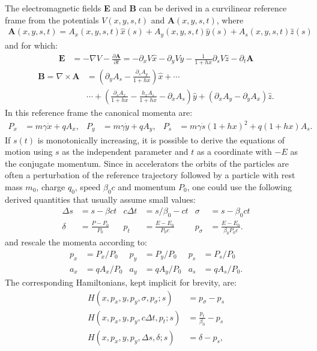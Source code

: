 \documentclass[english]{article}
\begin{document}
The electromagnetic fields {\bf E} and {\bf B} can be derived in a curvilinear
reference frame from the potentials $V(x,y,s,t)$ and $\mathbf{A}(x,y,s,t)$, where
\begin{align}
\mathbf{A}(x,y,s,t)=A_x(x,y,s,t) \hat x(s) + A_y(x,y,s,t) \hat y(s) + A_s(x,y,s,t) \hat z(s)
\end{align}
and for which:
\begin{align}
  \mathbf{E} & = -\nabla V - \frac{\partial \mathbf{A}}{\partial t} 
               = -\partial_x V \hat x - \partial_y V \hat y -
  \frac{1}{1+h x}  \partial_s V \hat z - \partial_t \mathbf{A}
\end{align}
\begin{align}
  \mathbf{B} = \nabla\times\mathbf{A} & =
  \left(\partial_y A_s - \frac{\partial_s  A_y}{1+h x} \right) \hat x +\cdots \\
  &\cdots+\left(\frac{\partial_s A_x}{1+h x}-\frac{h_x A_s}{1+h x}
  -\partial_x A_s \right)\hat y
  +\left(\partial_x A_y - \partial_y A_x \right) \hat z.
\end{align}
In this reference frame the canonical momenta are:
\begin{align}
  P_x&=m \gamma \dot x + q A_x, &
  P_y&=m \gamma \dot y + q A_y, &
  P_s&=m \gamma \dot s (1 + h x)^2 + q (1 + h x) A_s.
\end{align}
If $s(t)$ is monotonically increasing, it is possible to derive the equations
of motion using $s$ as the independent parameter and $t$ as a coordinate with
$-E$ as the conjugate momentum. Since in accelerators the orbits of the
particles are often a perturbation of the reference trajectory followed by a
particle with rest mass $m_0$, charge $q_0$, speed $\beta_0 c$ and momentum
$P_0$, one could use the following derived quantities that usually assume small
values:
\begin{align}
  \Delta s  &=s - \beta  ct &
  c\Delta t &=s/\beta_0 - ct &
  \sigma    &= s - \beta_0 ct \\
  \delta    &=\frac{P-P_0}{P_0} &
  p_t       &=\frac{E-E_0}{P_0 c} &
  p_\sigma  &=\frac{E-E_0}{\beta_0 P_0 c}.
\end{align}
and rescale the momenta according to:
\begin{align}
  p_x&=P_x/P_0 &
  p_y&=P_y/P_0 &
  p_s&=P_s/P_0  \\
  a_x &=qA_x/P_0&
  a_y &=qA_y/P_0&
  a_s &=qA_s/P_0.
\end{align}
The corresponding Hamiltonians, kept implicit for brevity, are:
\begin{align}
  H \left(x,p_x,y,p_y,\sigma,p_\sigma;s\right) &= p_\sigma - p_s\\
  H \left(x,p_x,y,p_y,c\Delta t,p_t;s\right) &= \frac{p_t}{\beta_0} - p_s\\
  H \left(x,p_x,y,p_y,\Delta s,\delta;s\right) &= \delta - p_s,
\end{align}
\end{document}
